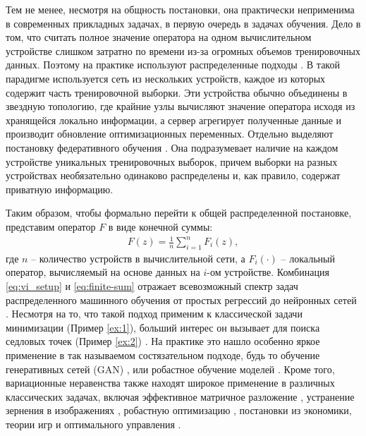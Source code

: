 \documentclass{ProcISPRAS}
\begin{document}
Тем не менее, несмотря на общность постановки, она практически неприменима в современных прикладных задачах, в первую очередь в задачах обучения. Дело в том, что считать полное значение оператора на одном вычислительном устройстве слишком затратно по времени из-за огромных объемов тренировочных данных. Поэтому на практике используют распределенные подходы \cite{kairouz2021advances,li2020federated,verbraeken2020survey}. В такой парадигме используется сеть из нескольких устройств, каждое из которых содержит часть тренировочной выборки. Эти устройства обычно объединены в звездную топологию, где крайние узлы вычисляют значение оператора исходя из хранящейся локально информации, а сервер агрегирует полученные данные и производит обновление оптимизационных переменных. Отдельно выделяют постановку федеративного обучения \cite{konevcny2016federated, smith2017federated, mcmahan2017communication}. Она подразумевает наличие на каждом устройстве уникальных тренировочных выборок, причем выборки на разных устройствах необязательно одинаково распределены и, как правило, содержат приватную информацию. 

Таким образом, чтобы формально перейти к общей распределенной постановке, представим оператор $F$ в виде конечной суммы:
\begin{align}
\label{eq:finite-sum}
    F(z) = \frac{1}{n}\sum\limits_{i=1}^n F_i(z),
\end{align}
где $n$ -- количество устройств в вычислительной сети, а $F_i(\cdot)$ -- локальный оператор, вычисляемый на основе данных на $i$-ом устройстве. Комбинация \eqref{eq:vi_setup} и \eqref{eq:finite-sum} отражает всевозможный спектр задач распределенного машинного обучения от простых регрессий до нейронных сетей \cite{lecun2015deep}. Несмотря на то, что такой подход применим к классической задачи минимизации (Пример \ref{ex:1}), больший интерес он вызывает для поиска седловых точек (Пример \ref{ex:2}) \cite{beznosikov2020distributed}. На практике это нашло особенно яркое применение в так называемом состязательном подходе, будь то обучение генеративных сетей (GAN) \cite{goodfellow2020generative}, или робастное обучение моделей \cite{liu2020adversarial, zhu2019freelb}. Кроме того, вариационные неравенства также находят широкое применение в различных классических задачах, включая эффективное матричное разложение \cite{bach2008convex}, устранение зернения в изображениях \cite{esser2010general, chambolle2011first}, робастную оптимизацию \cite{ben2009robust}, постановки из экономики, теории игр \cite{von1953theory} и оптимального управления \cite{facchinei2003finite}.
\end{document}
